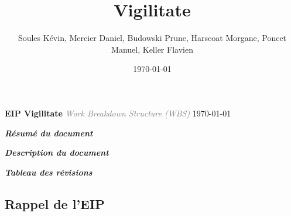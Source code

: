 \documentclass[a4paper,12pt]{report}
\title{\doctitle{} Vigilitate}
\author{Soules Kévin, Mercier Daniel, Budowski Prune, Harscoat Morgane, Poncet Manuel, Keller Flavien}
\date{\today}
\newcommand{\doctitle}{WBS}
\newcommand{\doclongtitle}{Work Breakdown Structure}
\begin{document}
\setcounter{page}{-10}


\pagestyle{empty}
\begin{center}\textcolor{myBlue}{\Huge \textbf{EIP Vigilitate}}\linebreak
\pagestyle{eip}
\textcolor{gray}{\textit{\Large \doclongtitle{} (\doctitle{})}}\linebreak
{}
{\today}\end{center}
\newpage
{}
\begin{flushleft}\textcolor{myBlue}{\textit{\large \textbf{Résumé du document}}} \linebreak \end{flushleft}
\pagestyle{eip}


\newpage
\begin{flushleft}
\textcolor{myBlue}{\textit{\large \textbf{Description du document}}} 
\bigbreak
\pagestyle{eip}

\bigbreak
\bigbreak
\textcolor{myBlue}{\textit{\large \textbf{Tableau des révisions}}}
\bigbreak
\pagestyle{eip}


\end{flushleft}
\tableofcontents
\thispagestyle{eip}


\textcolor{myBlue}{\chapter{Rappel de l'EIP}}

\setcounter{page}{1}
\thispagestyle{eip}





\end{document}
